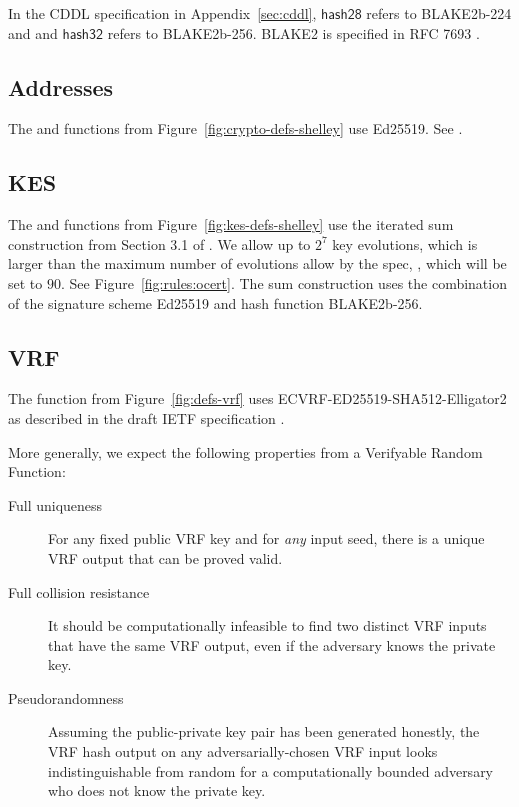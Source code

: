 In the CDDL specification in Appendix~\ref{sec:cddl},
$\mathsf{hash28}$ refers to BLAKE2b-224 and
and $\mathsf{hash32}$ refers to BLAKE2b-256.
BLAKE2 is specified in RFC 7693 \cite{rfcBLAKE2}.

\subsection{Addresses}
\label{sec:app-addresses}
The  and  functions from Figure~\ref{fig:crypto-defs-shelley}
use Ed25519. See \cite{rfcEdDSA}.

\subsection{KES}
The  and  functions from Figure~\ref{fig:kes-defs-shelley}
use the iterated sum construction from Section 3.1 of \cite{cryptoeprint:2001:034}.
We allow up to $2^7$ key evolutions, which is larger than the maximum number
of evolutions allow by the spec, \MaxKESEvo, which will be set to $90$.
See Figure~\ref{fig:rules:ocert}.
The sum construction uses the combination of the signature scheme Ed25519 and
hash function BLAKE2b-256.

\subsection{VRF}
\label{sec:app-vrf}
The  function from Figure~\ref{fig:defs-vrf}
uses ECVRF-ED25519-SHA512-Elligator2 as described in the draft IETF specification
\cite{rfcVRFDraft}.

More generally, we expect the following properties from a Verifyable Random Function: 
\begin{description}
\item[Full uniqueness] For any fixed public VRF key and for \textit{any} input seed, there is a unique VRF output that can be proved valid. 
\item[Full collision resistance] It should be computationally infeasible to find two distinct VRF inputs that have the same VRF output, even if the adversary knows the private key. 
\item[Pseudorandomness] Assuming the public-private key pair has been generated honestly, the VRF hash output on any adversarially-chosen VRF input looks indistinguishable from random for a computationally bounded adversary who does not know the private key. 
\end{description}

